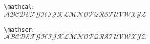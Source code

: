 \documentclass{article}
\newcommand{\upperalphabet}{ABCDEFGHIJKLMNOPQRSTUVWXYZ}
\begin{document}
\texttt{\textbackslash mathcal}:\\
$\mathcal{\upperalphabet}$

\texttt{\textbackslash mathscr}:\\
$\mathscr{\upperalphabet}$
\end{document}
